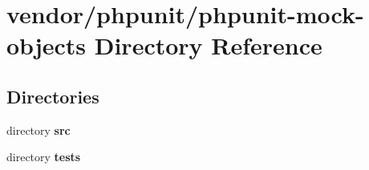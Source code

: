 \section{vendor/phpunit/phpunit-\/mock-\/objects Directory Reference}
\label{dir_1614213f801bed42a5d141b447d41c82}
\subsection*{Directories}
\begin{DoxyCompactItemize}
\item 
directory {\bf src}
\item 
directory {\bf tests}
\end{DoxyCompactItemize}
